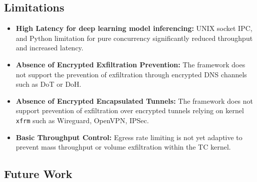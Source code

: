 \documentclass [11pt, proquest] {uwthesis}[2020/02/24]
\begin{document}
\subsection*{Limitations}

\begin{itemize}[itemsep=1pt,parsep=0pt]

  \item \textbf{High Latency for deep learning model inferencing:} UNIX socket IPC, and Python limitation for pure concurrency significantly reduced throughput and increased latency. 

  \item \textbf{Absence of Encrypted Exfiltration Prevention:} The framework does not support the prevention of exfiltration through encrypted DNS channels such as DoT or DoH.

  \item \textbf{Absence of Encrypted Encapsulated Tunnels:} The framework does not support prevention of exfiltration over encrypted tunnels relying on kernel \texttt{xfrm} such as Wireguard, OpenVPN, IPSec. 

  \item \textbf{Basic Throughput Control:} Egress rate limiting is not yet adaptive to prevent mass throughput or volume exfiltration within the TC kernel. 
\end{itemize}

\subsection*{Future Work}
\end{document}

